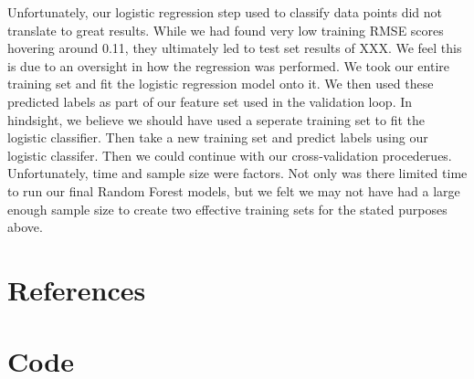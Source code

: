 \documentclass[11pt, oneside]{article}   	%
\begin{document}
Unfortunately, our logistic regression step used to classify data points did not translate to great results. While we had found very low training RMSE scores hovering around 0.11, they ultimately led to test set results of XXX. We feel this is due to an oversight in how the regression was performed. We took our entire training set and fit the logistic regression model onto it. We then used these predicted labels as part of our feature set used in the validation loop. In hindsight, we believe we should have used a seperate training set to fit the logistic classifier. Then take a new training set and predict labels using our logistic classifer. Then we could continue with our cross-validation procederues. Unfortunately, time and sample size were factors. Not only was there limited time to run our final Random Forest models, but we felt we may not have had a large enough sample size to create two effective training sets for the stated purposes above.

\newpage
\section{References}

\newpage
\section{Code}

 
 
\end{document}
